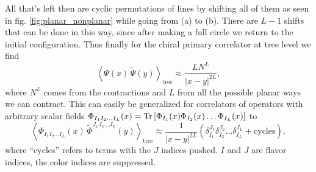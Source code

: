 All that's left then are cyclic permutations of lines by shifting all of them as seen in fig. \ref{fig:planar_nonplanar} while going from (a) to (b). 
There are $L-1$ shifts that can be done in this way, since after making a full circle we return to the initial configuration. 
Thus finally for the chiral primary correlator at tree level we find
\begin{equation}
	\left< \Psi(x) \, \tilde{\Psi}(y) \right>_{\mathrm{tree}} \approx \frac{L N^L}{|x-y|^{2L}},
\end{equation}
where $N^L$ comes from the contractions and $L$ from all the possible planar ways we can contract. 
This can easily be generalized for correlators of operators with arbitrary scalar fields $\Phi_{I_1 I_2 \dots I_L}(x) = \mathrm{Tr} \left[ \Phi_{I_1}(x) \Phi_{I_2}(x) \dots \Phi_{I_L}(x) \right]$ to
\begin{equation}
	\left< \Phi_{I_1 I_2 \dots I_L}(x) \, \tilde{\Phi}^{J_1 J_2 \dots J_L}(y)  \right>_{\mathrm{tree}} \approx \frac{1}{|x-y|^{2L}} \left( \delta_{I_1}^{J_1} \delta_{I_2}^{J_2} \dots \delta_{I_L}^{J_L} + \mathrm{cycles} \right),
	\label{eq:tree_correlator}
\end{equation}
where ``cycles'' refers to terms with the $J$ indices pushed. 
$I$ and $J$ are flavor indices, the color indices are suppressed.
 
